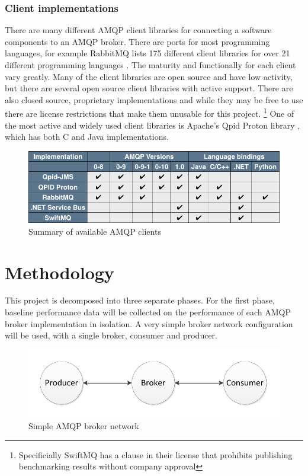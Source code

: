\documentclass{thesis}
\begin{document}
\subsection{Client implementations}
There are many different AMQP client libraries for connecting a software components to an AMQP broker.  There are ports for most programming languages, for example RabbitMQ lists 175 different client libraries for over 21 different programming languages \cite{RABBITMQ_CLIENTS}.  The maturity and functionally for each client vary greatly.  Many of the client libraries are open source and have low activity, but there are several open source client libraries with active support.  There are also closed source, proprietary implementations and while they may be free to use there are license restrictions that make them unusable for this project. \footnote{Specificially SwiftMQ has a clause in their license that prohibits publishing benchmarking results without company approval} One of the most active and widely used client libraries is Apache's Qpid Proton library \cite{QPID_PROTON}, which has both C and Java implementations.  

\begin{figure}[h]
\centering
\includegraphics[scale=.5]{client_comparision}  
\caption{Summary of available AMQP clients}
\end{figure}

\chapter{Methodology}
This project is decomposed into three separate phases.  For the first phase, baseline performance data will be collected on the performance of each AMQP broker implementation in isolation.  A very simple broker network configuration will be used, with a single broker, consumer and producer.

\begin{figure}[h]
\centering
\includegraphics{direct_connect}  
\caption{Simple AMQP broker network}
\end{figure}
\end{document}
